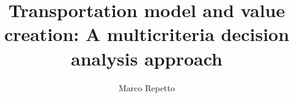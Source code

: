 \documentclass[a4paper,12pt,twoside]{book}
\begin{document}
  
\title{Transportation model and value creation: A multicriteria decision analysis approach}																
\author{Marco Repetto \hfill}
	
	\maketitle
	\salvastmpB
	\clearpage{\pagestyle{empty}\cleardoublepage}
	\tableofcontents	
	\listoffigures		
	\listoftables	%

	\printglossaries

	
	
	
	
	
	\printbibliography

	
\end{document}
